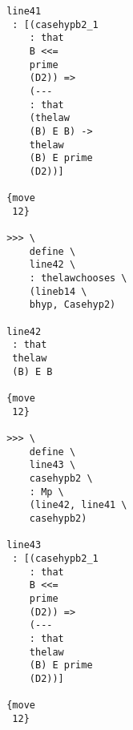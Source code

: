 \documentclass[12pt]{article}
\begin{document}
\begin{verbatim}
                                       line41 
                                        : [(casehypb2_1 
                                           : that 
                                           B <<= 
                                           prime 
                                           (D2)) => 
                                           (--- 
                                           : that 
                                           (thelaw 
                                           (B) E B) -> 
                                           thelaw 
                                           (B) E prime 
                                           (D2))]

                                       {move 
                                        12}

                                       >>> \
                                           define \
                                           line42 \
                                           : thelawchooses \
                                           (lineb14 \
                                           bhyp, Casehyp2)

                                       line42 
                                        : that 
                                        thelaw 
                                        (B) E B

                                       {move 
                                        12}

                                       >>> \
                                           define \
                                           line43 \
                                           casehypb2 \
                                           : Mp \
                                           (line42, line41 \
                                           casehypb2)

                                       line43 
                                        : [(casehypb2_1 
                                           : that 
                                           B <<= 
                                           prime 
                                           (D2)) => 
                                           (--- 
                                           : that 
                                           thelaw 
                                           (B) E prime 
                                           (D2))]

                                       {move 
                                        12}


\end{verbatim}
\end{document}
